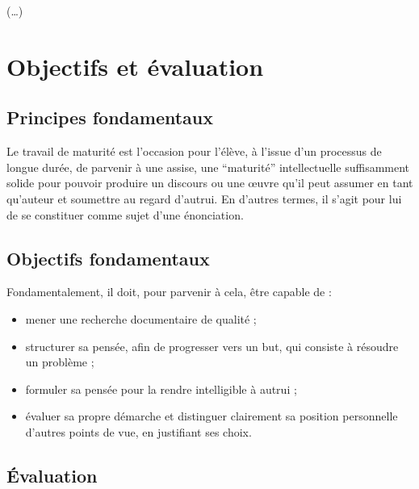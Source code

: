 \documentclass[
  10pt,
  french,
  a5paper,
  openany]{book}
\providecommand{\tightlist}{%
  \setlength{\itemsep}{0pt}\setlength{\parskip}{0pt}}
\begin{document}
(\ldots)

\hypertarget{objectifs-et-uxe9valuation}{%
\chapter*{Objectifs et évaluation}\label{objectifs-et-uxe9valuation}}

\hypertarget{principes-fondamentaux}{%
\section*{Principes fondamentaux}\label{principes-fondamentaux}}

Le travail de maturité est l'occasion pour l'élève, à l'issue d'un processus de longue durée, de parvenir à une assise, une ``maturité'' intellectuelle suffisamment solide pour pouvoir produire un discours ou une œuvre qu'il peut assumer en tant qu'auteur et soumettre au regard d'autrui. En d'autres termes, il s'agit pour lui de se constituer comme sujet d'une énonciation.

\hypertarget{objectifs-fondamentaux}{%
\section*{Objectifs fondamentaux}\label{objectifs-fondamentaux}}

Fondamentalement, il doit, pour parvenir à cela, être capable de :

\begin{itemize}
\tightlist
\item
  mener une recherche documentaire de qualité ;
\item
  structurer sa pensée, afin de progresser vers un but, qui consiste à résoudre un problème ;
\item
  formuler sa pensée pour la rendre intelligible à autrui ;
\item
  évaluer sa propre démarche et distinguer clairement sa position personnelle d'autres points de vue, en justifiant ses choix.
\end{itemize}

\hypertarget{uxe9valuation}{%
\section*{Évaluation}\label{uxe9valuation}}
\end{document}
